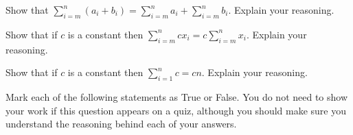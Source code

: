 \documentclass[addpoints,12pt]{exam}
\begin{document}
\begin{questions}




\question Show that $\displaystyle \sum_{i = m}^n (a_i + b_i) = \sum_{i=m}^n a_i + \sum_{i=m}^n b_i$. Explain your reasoning.

\question Show that if $c$ is a constant then $\displaystyle \sum_{i=m}^n c x_i = c \sum_{i=m}^n x_i$. Explain your reasoning.

\question Show that if $c$ is a constant then $\displaystyle \sum_{i=1}^n c = cn$. Explain your reasoning.

\question Mark each of the following statements as True or False. You do not need to show your work if this question appears on a quiz, although you should make sure you understand the reasoning behind each of your answers.
\end{questions}
\end{document}
